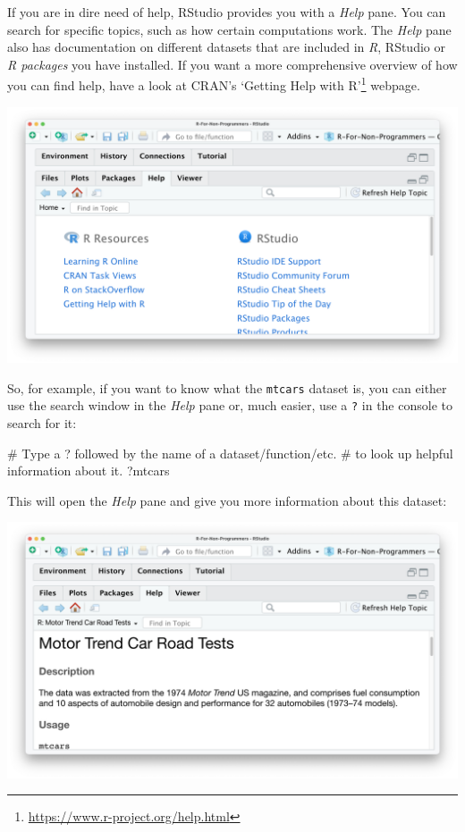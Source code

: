\documentclass[
  letterpaper,
]{krantz}
\makeatletter
\newenvironment{Shaded}{\begin{snugshade}}{\end{snugshade}}
\newcommand{\CommentTok}[1]{\textcolor[rgb]{0.37,0.37,0.37}{#1}}
\newcommand{\NormalTok}[1]{\textcolor[rgb]{0.00,0.23,0.31}{#1}}
\renewcommand{\href}[2]{#2\footnote{\url{#1}}}
\newenvironment{kframe}{%
\medskip{}
\setlength{\fboxsep}{.8em}
 \def\at@end@of@kframe{}%
 \ifinner\ifhmode%
  \def\at@end@of@kframe{\end{minipage}}%
  \begin{minipage}{\columnwidth}%
 \fi\fi%
 \def\FrameCommand##1{\hskip\@totalleftmargin \hskip-\fboxsep
 \colorbox{shadecolor}{##1}\hskip-\fboxsep
     \hskip-\linewidth \hskip-\@totalleftmargin \hskip\columnwidth}%
 \MakeFramed {\advance\hsize-\width
   \@totalleftmargin\z@ \linewidth\hsize
   \@setminipage}}%
 {\par\unskip\endMakeFramed%
 \at@end@of@kframe}
\renewenvironment{Shaded}{\begin{kframe}}{\end{kframe}}
\makeatother
\begin{document}
If you are in dire need of help, RStudio provides you with a \emph{Help}
pane. You can search for specific topics, such as how certain
computations work. The \emph{Help} pane also has documentation on
different datasets that are included in \emph{R}, RStudio or \emph{R
packages} you have installed. If you want a more comprehensive overview
of how you can find help, have a look at CRAN's
\href{https://www.r-project.org/help.html}{`Getting Help with R'}
webpage.

\includegraphics{images/chapter_04_img/05_files_plots_etc/04_rstudio_help.png}

So, for example, if you want to know what the \texttt{mtcars} dataset
is, you can either use the search window in the \emph{Help} pane or,
much easier, use a \texttt{?} in the console to search for it:

\begin{Shaded}
\begin{Highlighting}[]
\CommentTok{\# Type a \textquotesingle{}?\textquotesingle{} followed by the name of a dataset/function/etc.}
\CommentTok{\# to look up helpful information about it.}
\NormalTok{?mtcars}
\end{Highlighting}
\end{Shaded}

This will open the \emph{Help} pane and give you more information about
this dataset:

\includegraphics{images/chapter_04_img/05_files_plots_etc/04_rstudio_help_mtcars.png}
\end{document}
